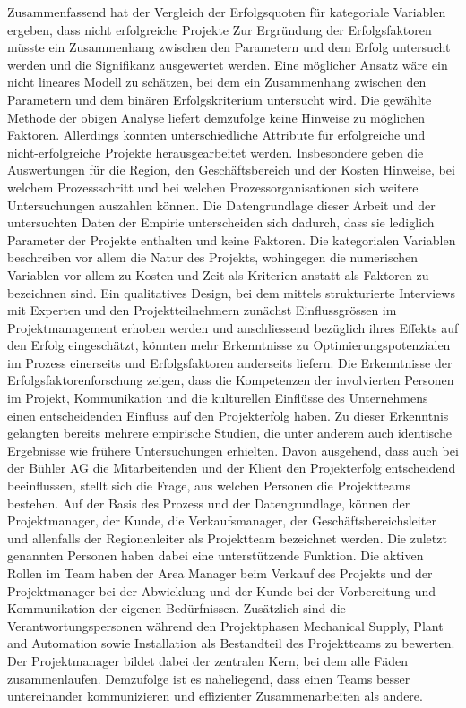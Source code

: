 \newline\newline
Zusammenfassend hat der Vergleich der Erfolgsquoten für kategoriale Variablen ergeben, dass nicht erfolgreiche Projekte 
Zur Ergründung der Erfolgsfaktoren müsste ein Zusammenhang zwischen den Parametern und dem Erfolg untersucht werden und die Signifikanz ausgewertet werden. Eine möglicher Ansatz wäre ein nicht lineares Modell zu schätzen, bei dem ein Zusammenhang zwischen den Parametern und dem binären Erfolgskriterium untersucht wird. Die gewählte Methode der obigen Analyse liefert demzufolge keine Hinweise zu möglichen Faktoren. Allerdings konnten unterschiedliche Attribute für erfolgreiche und nicht-erfolgreiche Projekte herausgearbeitet werden. Insbesondere geben die Auswertungen für die Region, den Geschäftsbereich und der Kosten Hinweise, bei welchem Prozessschritt und bei welchen Prozessorganisationen sich weitere Untersuchungen auszahlen können.
\newline\newline
Die Datengrundlage dieser Arbeit und der untersuchten Daten der Empirie unterscheiden sich dadurch, dass sie lediglich Parameter der Projekte enthalten und keine Faktoren. Die kategorialen Variablen beschreiben vor allem die Natur des Projekts, wohingegen die numerischen Variablen vor allem zu Kosten und Zeit als Kriterien anstatt als Faktoren zu bezeichnen sind. Ein qualitatives Design, bei dem mittels strukturierte Interviews mit Experten und den Projektteilnehmern zunächst Einflussgrössen im Projektmanagement erhoben werden und anschliessend bezüglich ihres Effekts auf den Erfolg eingeschätzt, könnten mehr Erkenntnisse zu Optimierungspotenzialen im Prozess einerseits und Erfolgsfaktoren anderseits liefern. 
\newline\newline
Die Erkenntnisse der Erfolgsfaktorenforschung zeigen, dass die Kompetenzen der involvierten Personen im Projekt, Kommunikation und die kulturellen Einflüsse des Unternehmens einen entscheidenden Einfluss auf den Projekterfolg haben. Zu dieser Erkenntnis gelangten bereits mehrere empirische Studien, die unter anderem auch identische Ergebnisse wie frühere Untersuchungen erhielten. Davon ausgehend, dass auch bei der Bühler AG die Mitarbeitenden und der Klient den Projekterfolg entscheidend beeinflussen, stellt sich die Frage, aus welchen Personen die Projektteams bestehen. Auf der Basis des Prozess und der Datengrundlage, können der Projektmanager, der Kunde, die Verkaufsmanager, der Geschäftsbereichsleiter und allenfalls der Regionenleiter als Projektteam bezeichnet werden. Die zuletzt genannten Personen haben dabei eine unterstützende Funktion. Die aktiven Rollen im Team haben der Area Manager beim Verkauf des Projekts und der Projektmanager bei der Abwicklung und der Kunde bei der Vorbereitung und Kommunikation der eigenen Bedürfnissen. Zusätzlich sind die Verantwortungspersonen während den Projektphasen Mechanical Supply, Plant and Automation sowie Installation als Bestandteil des Projektteams zu bewerten. Der Projektmanager bildet dabei der zentralen Kern, bei dem alle Fäden zusammenlaufen. Demzufolge ist es naheliegend, dass einen Teams besser untereinander kommunizieren und effizienter Zusammenarbeiten als andere. 

